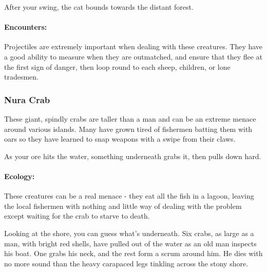 \begin{multicols}{2}
\begin{boxtext}
	After your swing, the cat bounds towards the distant forest.

\end{boxtext}

\paragraph{Encounters:} Projectiles are extremely important when dealing with these creatures.
They have a good ability to measure when they are outmatched, and ensure that they flee at the first sign of danger, then loop round to each sheep, children, or lone tradesmen.

\nuracat

\subsubsection{Nura Crab}\label{nura_crab}

These giant, spindly crabs are taller than a man and can be an extreme menace around various islands.
Many have grown tired of fishermen batting them with oars so they have learned to snap weapons with a swipe from their claws.

\begin{boxtext}

	As your ore hits the water, something underneath grabs it, then pulls down hard.

\end{boxtext}

\paragraph{Ecology:} These creatures can be a real menace - they eat all the fish in a lagoon, leaving the local fishermen with nothing and little way of dealing with the problem except waiting for the crab to starve to death.

\begin{boxtext}

	Looking at the shore, you can guess what's underneath.
	Six crabs, as large as a man, with bright red shells, have pulled out of the water as an old man inspects his boat.
	One grabs his neck, and the rest form a scrum around him.
	He dies with no more sound than the heavy carapaced legs tinkling across the stony shore.

\end{boxtext}

\nuracrab

\label{nura_horse}
\nurahorse


\end{multicols}
